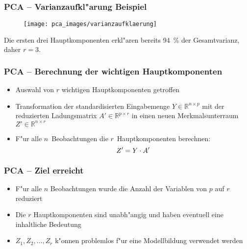 
\begin{frame}

\frametitle{PCA -- Varianzaufkl"arung Beispiel}

\begin{figure}[h]
\centering
\texttt{[image: pca\_images/varianzaufklaerung]}
\end{figure}

Die ersten drei Hauptkomponenten erkl"aren bereits 94~\% der Gesamtvarianz, daher $r=3$.

\end{frame}







\begin{frame}

\frametitle{PCA -- Berechnung der wichtigen Hauptkomponenten}

\begin{itemize}
\setlength{\itemsep}{15pt}
\item Auswahl von $r$ wichtigen Hauptkomponenten getroffen
\item Transformation der standardisierten Eingabemenge $Y \in \mathbb{R}^{n \times p}$ mit der reduzierten Ladungsmatrix $A' \in \mathbb{R}^{p \times r}$ in einen neuen Merkmalsunterraum $Z' \in \mathbb{R}^{n \times r}$
\item F"ur alle $n$~Beobachtungen die $r$~Hauptkomponenten berechnen:
\begin{equation}
Z' = Y \cdot A' \notag
\end{equation}
\end{itemize}
\end{frame}







\begin{frame}

\frametitle{PCA -- Ziel erreicht}

\begin{itemize}
\setlength{\itemsep}{15pt}
\item F"ur alle $n$ Beobachtungen wurde die Anzahl der Variablen von $p$ auf $r$ reduziert
\item Die $r$ Hauptkomponenten sind unabh"angig und haben eventuell eine inhaltliche Bedeutung
\item $Z_1,Z_2,\ldots,Z_r$ k"onnen problemlos f"ur eine Modellbildung verwendet werden
\end{itemize}

\end{frame}







